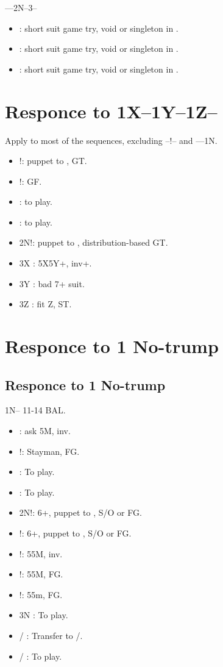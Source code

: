 \documentclass[12pt,twoside,a5paper]{report}%
\begin{document}
	----2N--3\cl{}--
	\begin{itemize}
	\renewcommand{\labelitemi}{}
	\item {} : short suit game try, void or singleton in \di{}.
	\item {} : short suit game try, void or singleton in \he{}.
	\item {} : short suit game try, void or singleton in \cl{}.
	\end{itemize}

\chapter*{Responce to 1X--1Y--1Z--}
	Apply to most of the sequences, excluding --!-- and ----1N.
	\begin{itemize}
	\renewcommand{\labelitemi}{}
		\item {}!: puppet to , GT.
		\item {}!: GF.
		\item {} : to play.
		\item {} : to play.
		\item 2N!: puppet to , distribution-based GT.
		\item 3X : 5X5Y+, inv+.
		\item 3Y : bad 7+ suit.
		\item 3Z : fit Z, ST.
	\end{itemize}
\chapter*{Responce to 1 No-trump}

	\section*{Responce to 1 No-trump}
		1N-- 11-14 BAL.
		\begin{itemize}
		\renewcommand{\labelitemi}{}
		\item {} : ask 5M, inv.
		\item {}!: Stayman, FG.
		\item {} : To play.
		\item {} : To play.
		\item 2N!: 6+\cl{}, puppet to , S/O or FG.
		\item {}!: 6+\di{}, puppet to , S/O or FG.
		\item {}!: 55M, inv.
		\item {}!: 55M, FG.
		\item {}!: 55m, FG.
		\item 3N : To play.
		\item {}/ : Transfer to /\sp{}.
		\item {}/ : To play.
		\end{itemize}
\end{document}
